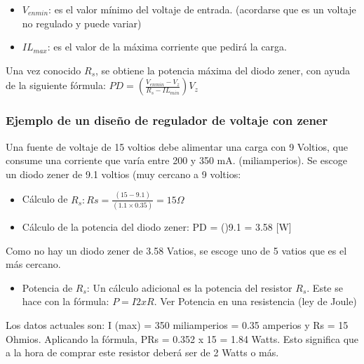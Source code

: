 \documentclass{article}
\begin{document}
\begin{itemize}
    \item     $V_{enmin}$: es el valor mínimo del voltaje de entrada. (acordarse que es un voltaje no regulado y puede variar)
    \item $IL _{max}$: es el valor de la máxima corriente que pedirá la carga.
\end{itemize}

Una vez conocido $R_s$, se obtiene la potencia máxima del diodo zener, con ayuda de la siguiente fórmula: $PD = (\frac{V_{enmin}-V_z}{R_s-IL_{min}})V_z$ \citep{regZener}\\


\subsubsection{Ejemplo de un diseño de regulador de voltaje con zener}

Una fuente de voltaje de 15 voltios debe alimentar una carga con 9 Voltios, que consume una corriente que varía entre 200 y 350 mA. (miliamperios). Se escoge un diodo zener de 9.1 voltios (muy cercano a 9 voltios:\\

\begin{itemize}
    \item Cálculo de $R_s: Rs =\frac{(15-9.1)}{(1.1×0.35)}= 15 \Omega$
\item Cálculo de la potencia del diodo zener: PD = ()9.1 = 3.58 [W]
\end{itemize}

Como no hay un diodo zener de 3.58 Vatios, se escoge uno de 5 vatios que es el más cercano.\\

\begin{itemize}
    \item Potencia de $R_s$: Un cálculo adicional es la potencia del resistor $R_s$. Este se hace con la fórmula: $P = I2 x R$. Ver Potencia en una resistencia (ley de Joule)
\end{itemize}

Los datos actuales son: I (max) = 350 miliamperios = 0.35 amperios y Rs = 15 Ohmios. Aplicando la fórmula, PRs = 0.352 x 15 = 1.84 Watts. Esto significa que a la hora de comprar este resistor deberá ser de 2 Watts o más.\citep{regZener}\\[2cm]





\end{document}
